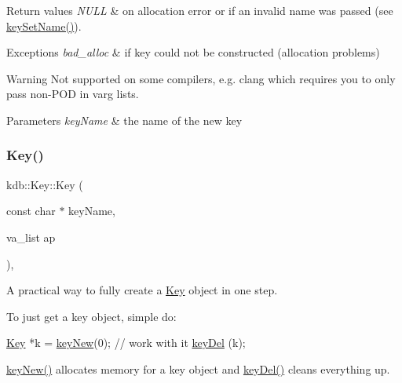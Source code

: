 \begin{DoxyRetVals}{Return values}
{\em N\+U\+LL} & on allocation error or if an invalid {\ttfamily name} was passed (see \hyperlink{group__keyname_ga7699091610e7f3f43d2949514a4b35d9}{key\+Set\+Name()}).\\
\hline
\end{DoxyRetVals}

\begin{DoxyExceptions}{Exceptions}
{\em bad\+\_\+alloc} & if key could not be constructed (allocation problems)\\
\hline
\end{DoxyExceptions}
\begin{DoxyWarning}{Warning}
Not supported on some compilers, e.\+g. clang which requires you to only pass non-\/\+P\+OD in varg lists.
\end{DoxyWarning}

\begin{DoxyParams}{Parameters}
{\em key\+Name} & the name of the new key \\
\hline
\end{DoxyParams}
\mbox{\label{classkdb_1_1Key_aa0dc94c7e676a0d280e5817e4c6238d3}} 
\subsubsection{\texorpdfstring{Key()}{Key()}\hspace{0.1cm}{\footnotesize\ttfamily [7/7]}}
{\footnotesize\ttfamily kdb\+::\+Key\+::\+Key (\begin{DoxyParamCaption}\item[{const char $\ast$}]{key\+Name,  }\item[{va\+\_\+list}]{ap }\end{DoxyParamCaption})\hspace{0.3cm}{\ttfamily [inline]}, {\ttfamily [explicit]}}



A practical way to fully create a \hyperlink{classkdb_1_1Key}{Key} object in one step. 

To just get a key object, simple do\+:


\begin{DoxyCodeInclude}
\hyperlink{classkdb_1_1Key_a5679f5cae63caddd64a60388b9cc77fa}{Key} *k = \hyperlink{group__key_gad23c65b44bf48d773759e1f9a4d43b89}{keyNew}(0);
\textcolor{comment}{// work with it}
\hyperlink{group__key_ga3df95bbc2494e3e6703ece5639be5bb1}{keyDel} (k);
\end{DoxyCodeInclude}
 \hyperlink{group__key_gad23c65b44bf48d773759e1f9a4d43b89}{key\+New()} allocates memory for a key object and \hyperlink{group__key_ga3df95bbc2494e3e6703ece5639be5bb1}{key\+Del()} cleans everything up.

